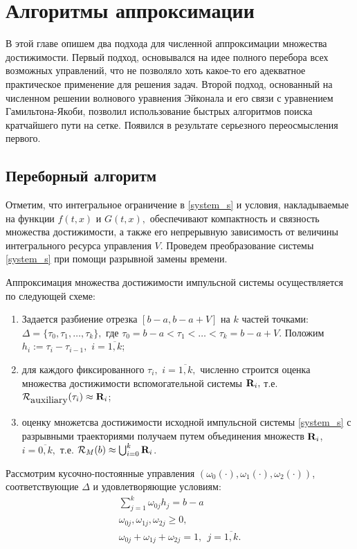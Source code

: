\chapter{Алгоритмы аппроксимации}
\label{ch:algrhtms}


В этой главе опишем два подхода для численной аппроксимации множества
достижимости. Первый подход, основывался на идее полного перебора всех
возможных управлений, что не позволяло хоть какое-то его адекватное
практическое применение для решения задач.  Второй подход, основанный
на численном решении волнового уравнения Эйконала и его связи с
уравнением Гамильтона-Якоби, позволил использование быстрых алгоритмов
поиска кратчайшего пути на сетке. Появился в результате серьезного
переосмысления первого.

\section{Переборный алгоритм}
\label{sec:simple_alg}

Отметим, что интегральное ограничение в
\eqref{system_s} и условия, накладываемые на функции $f(t,x)$ и $G(t,x),$
обеспечивают компактность и связность множества достижимости, а
также его непрерывную зависимость от величины интегрального
ресурса управления $V$. Проведем преобразование системы
\eqref{system_s} при помощи разрывной замены времени. 

Аппроксимация множества достижимости импульсной системы осуществляется по
следующей схеме:
\begin{enumerate}
\item Задается разбиение отрезка $[b-a,b-a+V]$ на $k$ частей точками:
  $ \Delta=\big\{ \tau_{0}, \tau_{1}, \ldots, \tau_{k} \big\}, $ где
  $\tau_{0}=b-a< \tau_{1}< \ldots < \tau_{k}=b-a+V$. Положим
  $h_i:=\tau_{i}-\tau_{i-1},$ $i=\overline{1,k}$;
\item для каждого фиксированного $\tau_{i},$ $i=\overline{1,k},$
  численно строится оценка множества достижимости вспомогательной
  системы $\mbox{\bf R}_i ,$ т.е.
  ${\mathcal R}_{\mbox{\rm auxiliary}}(\tau_{i}) \approx \mbox{\bf
    R}_i$;
\item оценку множетсва достижимости исходной импульсной системы \eqref{system_s} с
  разрывными траекториями получаем путем объединения множеств
  $\mbox{\bf R}_i$, $i=\overline{0,k},$ т.е.
  $ {\mathcal R}_M(b)\approx \bigcup_{i=0}^k \mbox{\bf R}_i$.
\end{enumerate}


Рассмотрим кусочно-постоянные управления
$(\omega_0(\cdot),\omega_1(\cdot),\omega_2(\cdot))$, соответствующие
$\Delta$ и удовлетворяющие условиям:
\begin{equation*}
  \begin{array}{l}
    \sum_{j=1}^k \omega_{0j}h_j=b-a\\
    \omega_{0j}, \omega_{1j}, \omega_{2j} \geq 0,\\ 
    \omega_{0j}+ \omega_{1j}+ \omega_{2j} =1, \ \ j=\overline{1,k}.
  \end{array}
\end{equation*}


